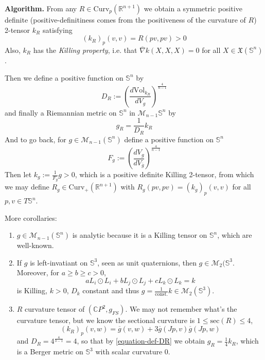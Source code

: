 {\bf Algorithm.} From any $R\in \text{Curv}_p(\mathbb{R}^{n+1})$ we obtain a
symmetric positive definite (positive-definitiness comes from the positiveness
of the curvature of $R$) 2-tensor  $k_R$ satisfying
$$
(k_R)_p(v,v)=R(pv,pv)>0
$$
Also, $k_R$ has the  {\it Killing property},
i.e. that $\overline{\nabla}k(X,X,X)=0$ for all
$X\in\mathfrak{X}(\mathbb{S}^n)$.

Then we define a positive function on
 $\mathbb{S}^n$ by
\begin{equation}
\label{equation-def-DR}
D_R:=\left(\frac{d\text{Vol}_{k_R}}{dV_g}\right)^{\frac{4}{n-1}}
\end{equation}
and finally a Riemannian metric on $\mathbb{S}^n$ in
$\mathcal{M}_{n-1}\mathbb{S}^n$ by
$$
g_R=\frac{1}{D_R}k_R
$$
And to go back, for $g \in \mathcal{M}_{n-1}(\mathbb{S}^n)$ define a positive 
function on $\mathbb{S}^n$
$$
F_g:=\left(\frac{dV_g}{dV_{\overline{g}}}\right)^{\frac{4}{n-1}}
$$
Then let $k_g:=\frac{1}{F_g}g>0$, which is a positive definite Killing 2-tensor,
from which we may define $R_g\in\text{Curv}_+(\mathbb{R}^{n+1})$ with
$R_g(pv,pv)=(k_g)_p(v,v)$ for all $p,v\in T\mathbb{S}^n$.

More corollaries:
\begin{lemma}
\label{lemma-corollaries2}
\begin{enumerate}
\item $g\in\mathcal{M}_{n-1}(\mathbb{S}^n)$ is analytic because it is a Killing
tensor on $\mathbb{S}^n$, which are well-known.
\item If $g$ is left-invatiant on $\mathbb{S}^3$, seen as unit quaternions, then
$g\in\mathcal{M}_2(\mathbb{S}^3$. Moreover, for $a\geq b\geq c>0$,
$$
aL_i\odot L_i+bL_j\odot L_j+cL_k\odot L_k=k
$$
is Killing, $k>0$,  $D_k$ constant and thus $g=\frac{1}{\text{const.}}k
\in\mathcal{M}_2(\mathbb{S}^3)$.
\item $R$ curvature tensor of $(\mathbb{C}P^{2},g_{FS})$. We may not remember
what's the curvature tensor, but we know the sectional curvature is $1\leq
\text{sec}(R)\leq 4$,
$$
(k_R)_p(v,w)=\overline{g}(v,w)+3\overline{g}(Jp,v)\overline{g}(Jp,w)
$$
and $D_R=4^{\frac{4}{3-1}}=4$, so that by \ref{equation-def-DR} we obtain 
$g_R=\frac{1}{4}k_R$, which is a Berger
metric on $\mathbb{S}^3$ with scalar curvature 0.
\end{enumerate}
\end{lemma}

